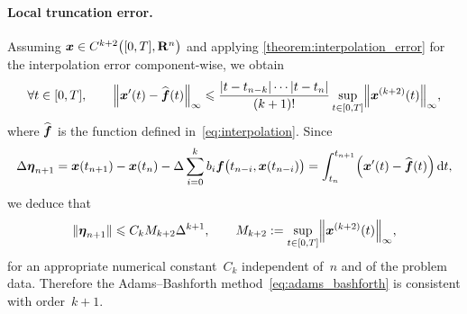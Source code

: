 \paragraph{Local truncation error.}
Assuming $\mathbf{\boldsymbol{x}} \in C^{k+2}\bigl([0, T], \mathbf R^n\bigr)$ and applying \cref{theorem:interpolation_error} for the interpolation error component-wise,
we obtain
\[
    \forall t \in [0, T], \qquad \vecnorm*{\vect x'(t) - \widehat {\vect f}(t)}_{\infty}
    \leq \frac{\lvert t- t_{n-k} \rvert \dotsb \lvert t - t_n \rvert}{(k+1)!} \sup_{t \in [0, T]} \vecnorm*{\vect x^{(k+2)}(t)}_{\infty},
\]
where $\widehat {\mathbf{\boldsymbol{f}}}$ is the function defined in~\eqref{eq:interpolation}.
Since
\[
    \Delta \mathbf{\boldsymbol{\eta}}_{n+1}
    = \mathbf{\boldsymbol{x}}(t_{n+1}) - \mathbf{\boldsymbol{x}}(t_n) - \Delta \sum_{i=0}^{k} b_i \mathbf{\boldsymbol{f}}\bigl(t_{n-i}, \mathbf{\boldsymbol{x}}(t_{n-i})\bigr)
    = \int_{t_n}^{t_{n+1}} \Bigl(\mathbf{\boldsymbol{x}}'(t) - \widehat{\mathbf{\boldsymbol{f}}}(t)\Bigr) \, \mathrm d t,
\]
we deduce that
\begin{equation}
    \label{eq:truncation_adams_bashforth}
    \vecnorm{\vect \eta_{n+1}} \leq C_k M_{k+2} \Delta^{k+1},
    \qquad M_{k+2} := \sup_{t \in [0, T]} \vecnorm*{\vect x^{(k+2)}(t)}_{\infty},
\end{equation}
for an appropriate numerical constant~$C_k$ independent of~$n$ and of the problem data.
Therefore the Adams--Bashforth method~\eqref{eq:adams_bashforth} is consistent with order~$k+1$.

